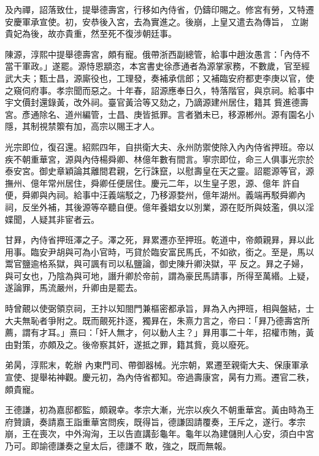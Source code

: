 \begin{pinyinscope}
 及內禪，詔落致仕，提舉德壽宮，行移如內侍省，仍鑄印賜之。修宮有勞，又特遷安慶軍承宣使。初，安恭後入宮，去為實進之。後崩，上皇又遣去為傳旨，
 立謝貴妃為後，故亦貴重，然至死不復涉朝廷事。



 陳源，淳熙中提舉德壽宮，頗有寵。俄帶浙西副總管，給事中趙汝愚言：「內侍不當干軍政。」遂罷。源恃恩顓恣，本宮書史徐彥通者為源掌家務，不數歲，官至經武大夫；甄士昌，源廝役也，工理發，奏補承信郎；又補臨安府都吏李庚以官，使之窺伺府事。孝宗聞而惡之。十年春，詔源應奉日久，特落階官，與京祠。給事中宇文價封還錄黃，改外祠。臺官黃洽等又劾之，乃謫源建州居住，籍其
 貲進德壽宮。彥通除名、道州編管，士昌、庚皆抵罪。言者猶未已，移源郴州。源有園名小隱，其制視禁籞有加，高宗以賜王才人。



 光宗即位，復召還。紹熙四年，自拱衛大夫、永州防禦使除入內內侍省押班。帝以疾不朝重華宮，源與內侍楊舜卿、林億年數有間言。寧宗即位，命三人俱事光宗於泰安宮。御史章穎論其離間君親，乞行誅竄，以慰壽皇在天之靈。詔罷源等官，源撫州、億年常州居住，舜卿任便居住。慶元二年，以生皇子恩，源、億年
 許自便，舜卿與內祠。給事中汪義端駁之，乃移源婺州，億年湖州。義端再駁舜卿內祠，反坐外補，其後源等卒聽自便。億年養娼女以別業，源在貶所與妓濫，俱以淫媟聞，人疑其非宦者云。



 甘昪，內侍省押班澤之子。澤之死，昪累遷亦至押班。乾道中，帝頗親昪，昪以此用事。臨安尹胡與可為小官時，丐貸於臨安富民馬氏，不如欲，銜之。至是，馬以鬻官鹽逾格系獄，與可諷有司以私鹽論，御史陳升卿決獄，平
 反之。昪之子婦，與可女也，乃陰為與可地，譖升卿於帝前，謂為豪民馬請事，所得至萬緡。上疑，遂論罪，馬流嚴州，升卿由是罷去。



 時曾覿以使弼領京祠，王抃以知閤門兼樞密都承旨，昪為入內押班，相與盤結，士大夫無恥者爭附之。既而覿死抃逐，獨昪在，朱熹力言之，帝曰：「昪乃德壽宮所薦，謂有才耳。」熹曰：「奸人無才，何以動人主？」昪用事二十年，招權市賄，黃由對策，亦頗及之。後帝察其奸，遂抵之罪，籍其貲，竟以廢死。



 弟昺，淳熙末，乾辦
 內東門司、帶御器械。光宗朝，累遷至親衛大夫、保康軍承宣使、提舉祐神觀。慶元初，為內侍省都知。帝過壽康宮，昺有力焉。遷官二秩，頗貴寵。



 王德謙，初為嘉邸都監，頗親幸。孝宗大漸，光宗以疾久不朝重華宮。黃由時為王府贊讀，奏請嘉王詣重華宮問疾，既得旨，德謙固請覆奏，王斥之，遂行。孝宗崩，王在喪次，中外洶洶，王以告直講彭龜年。龜年以為建儲則人心安，須白中宮乃可。即諭德謙奏之皇太后，德謙不
 敢，強之，既而無報。




\end{pinyinscope}
